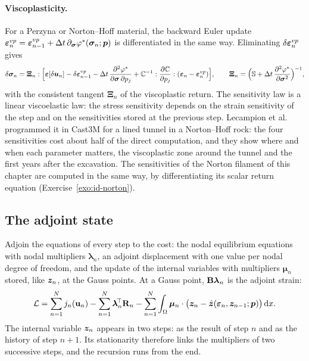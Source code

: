 \paragraph{Viscoplasticity.}
%
For a Perzyna or Norton--Hoff material, the backward Euler update
$\bm{\varepsilon}^{vp}_n=\bm{\varepsilon}^{vp}_{n-1}+\Delta t\,\partial_{\bm{\sigma}}\varphi^\ast(\bm{\sigma}_n;\bm{p})$ is
differentiated in the same way. Eliminating $\delta\bm{\varepsilon}^{vp}_n$ gives
\[
  \delta\bm{\sigma}_n=\boldsymbol\Xi_n:\Bigl[\bm{\varepsilon}[\delta\bm{u}_n]-\delta\bm{\varepsilon}^{vp}_{n-1}
  -\Delta t\,\frac{\partial^2\varphi^\ast}{\partial\bm{\sigma}\,\partial p_j}
  +\mathbb{C}^{-1}:\frac{\partial\mathbb{C}}{\partial p_j}:(\bm{\varepsilon}_n-\bm{\varepsilon}^{vp}_n)\Bigr],\qquad
  \boldsymbol\Xi_n=\Bigl(\mathbb{S}+\Delta t\,\frac{\partial^2\varphi^\ast}{\partial\bm{\sigma}^2}\Bigr)^{-1},
\]
with the consistent tangent $\boldsymbol\Xi_n$ of the viscoplastic return. The
sensitivity law is a linear viscoelastic law: the stress sensitivity depends on
the strain sensitivity of the step and on the sensitivities stored at the
previous step. Lecampion et al.~\cite{LecampionConstantinescuNguyen2002}
programmed it in Cast3M for a lined tunnel in a Norton--Hoff rock: the four
sensitivities cost about half of the direct computation, and they show where
and when each parameter matters, the viscoplastic zone around the tunnel and the
first years after the excavation. The sensitivities of the Norton filament of
this chapter are computed in the same way, by differentiating its scalar return
equation (Exercise~\ref{exo:id-norton}).

\subsection{The adjoint state}\label{ssec:id-path-adj}
%
Adjoin the equations of every step to the cost: the nodal equilibrium
equations with nodal multipliers $\boldsymbol\lambda_n$, an adjoint displacement
with one value per nodal degree of freedom, and the update of the internal
variables with multipliers $\boldsymbol\mu_n$ stored, like $\bm{z}_n$, at the Gauss
points. At a Gauss point, $\mathbf{B}\boldsymbol\lambda_n$ is the adjoint strain:
\begin{equation}\label{eq:id-lag-path}
  \mathcal L=\sum_{n=1}^Nj_n(\mathbf{u}_n)-\sum_{n=1}^N\boldsymbol\lambda_n^{\!\top}\mathbf{R}_n
  -\sum_{n=1}^N\int_\Omega\boldsymbol\mu_n\cdot\bigl(\bm{z}_n-\hat{\bm{z}}(\bm{\varepsilon}_n,\bm{z}_{n-1};\bm{p})\bigr)\,\mathrm{d} x .
\end{equation}
The internal variable $\bm{z}_n$ appears in two steps: as the result of step $n$
and as the history of step $n+1$. Its stationarity therefore links the
multipliers of two successive steps, and the recursion runs from the end.

